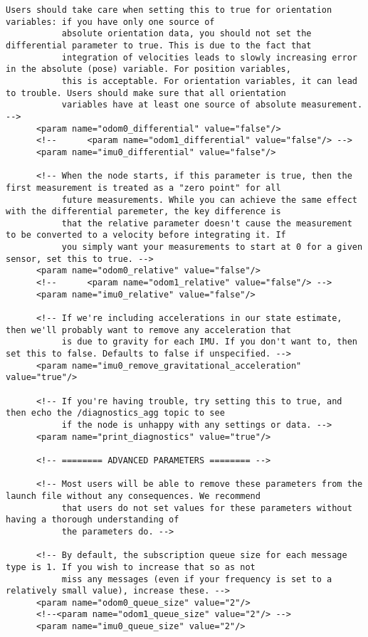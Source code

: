 \begin{lstlisting}[breaklines=true,basicstyle=\tiny]
           Users should take care when setting this to true for orientation variables: if you have only one source of
           absolute orientation data, you should not set the differential parameter to true. This is due to the fact that
           integration of velocities leads to slowly increasing error in the absolute (pose) variable. For position variables,
           this is acceptable. For orientation variables, it can lead to trouble. Users should make sure that all orientation
           variables have at least one source of absolute measurement. -->
      <param name="odom0_differential" value="false"/>
      <!--      <param name="odom1_differential" value="false"/> -->
      <param name="imu0_differential" value="false"/>

      <!-- When the node starts, if this parameter is true, then the first measurement is treated as a "zero point" for all
           future measurements. While you can achieve the same effect with the differential paremeter, the key difference is
           that the relative parameter doesn't cause the measurement to be converted to a velocity before integrating it. If
           you simply want your measurements to start at 0 for a given sensor, set this to true. -->
      <param name="odom0_relative" value="false"/>
      <!--      <param name="odom1_relative" value="false"/> -->
      <param name="imu0_relative" value="false"/>

      <!-- If we're including accelerations in our state estimate, then we'll probably want to remove any acceleration that
           is due to gravity for each IMU. If you don't want to, then set this to false. Defaults to false if unspecified. -->
      <param name="imu0_remove_gravitational_acceleration" value="true"/>

      <!-- If you're having trouble, try setting this to true, and then echo the /diagnostics_agg topic to see
           if the node is unhappy with any settings or data. -->
      <param name="print_diagnostics" value="true"/>

      <!-- ======== ADVANCED PARAMETERS ======== -->

      <!-- Most users will be able to remove these parameters from the launch file without any consequences. We recommend
           that users do not set values for these parameters without having a thorough understanding of
           the parameters do. -->

      <!-- By default, the subscription queue size for each message type is 1. If you wish to increase that so as not
           miss any messages (even if your frequency is set to a relatively small value), increase these. -->
      <param name="odom0_queue_size" value="2"/>
      <!--<param name="odom1_queue_size" value="2"/> -->
      <param name="imu0_queue_size" value="2"/>


\end{lstlisting}
